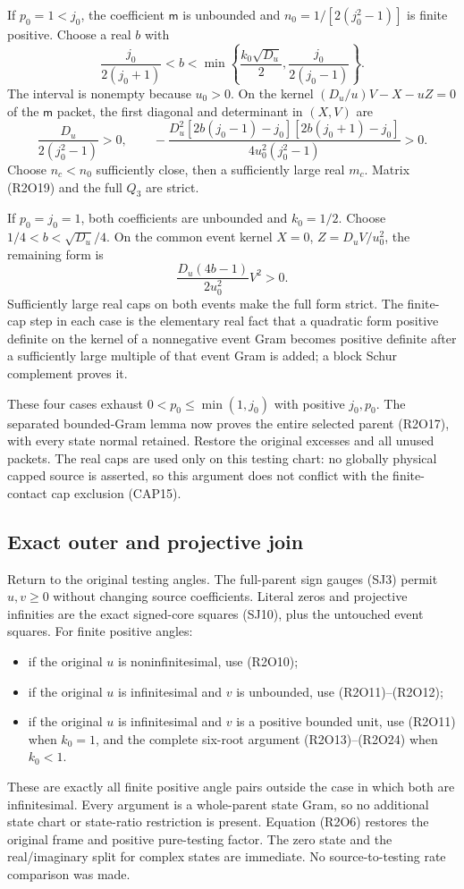 If $p_0=1<j_0$, the coefficient $\mathsf m$ is unbounded and
$n_0=1/[2(j_0^2-1)]$ is finite positive.  Choose a real $b$ with
\[
\frac{j_0}{2(j_0+1)}<b<
\min\left\{\frac{k_0\sqrt{D_u}}2,
                 \frac{j_0}{2(j_0-1)}\right\}.
\]
The interval is nonempty because $u_0>0$.  On the kernel
$(D_u/u)V-X-uZ=0$ of the $\mathsf m$ packet, the first diagonal
and determinant in $(X,V)$ are
\[
\frac{D_u}{2(j_0^2-1)}>0,\qquad
-\frac{D_u^2[2b(j_0-1)-j_0][2b(j_0+1)-j_0]}
       {4u_0^2(j_0^2-1)}>0.
\tag{R2O23}
\]
Choose $n_c<n_0$ sufficiently close, then a sufficiently large real
$m_c$.  Matrix (R2O19) and the full $Q_3$ are strict.

If $p_0=j_0=1$, both coefficients are unbounded and $k_0=1/2$.
Choose $1/4<b<\sqrt{D_u}/4$.  On the common event kernel
$X=0$, $Z=D_uV/u_0^2$, the remaining form is
\[
\frac{D_u(4b-1)}{2u_0^2}V^2>0.
\tag{R2O24}
\]
Sufficiently large real caps on both events make the full form strict.
The finite-cap step in each case is the elementary real fact that a
quadratic form positive definite on the kernel of a nonnegative event
Gram becomes positive definite after a sufficiently large multiple of
that event Gram is added; a block Schur complement proves it.

These four cases exhaust $0<p_0\leq\min(1,j_0)$ with positive $j_0,p_0$.
The separated bounded-Gram lemma now proves the entire selected parent
(R2O17), with every state normal retained.  Restore the original excesses
and all unused packets.  The real caps are used only on this testing
chart: no globally physical capped source is asserted, so this argument
does not conflict with the finite-contact cap exclusion (CAP15).

\subsection{Exact outer and projective join}

Return to the original testing angles.  The full-parent sign gauges
(SJ3) permit $u,v\geq0$ without changing source coefficients.  Literal
zeros and projective infinities are the exact signed-core squares
(SJ10), plus the untouched event squares.  For finite positive angles:
\begin{itemize}
\item if the original $u$ is noninfinitesimal, use (R2O10);
\item if the original $u$ is infinitesimal and $v$ is unbounded,
      use (R2O11)--(R2O12);
\item if the original $u$ is infinitesimal and $v$ is a positive
      bounded unit, use (R2O11) when $k_0=1$, and the complete
      six-root argument (R2O13)--(R2O24) when $k_0<1$.
\end{itemize}
These are exactly all finite positive angle pairs outside the case in
which both are infinitesimal.  Every argument is a whole-parent state
Gram, so no additional state chart or state-ratio restriction is present.
Equation (R2O6) restores the original frame and positive pure-testing
factor.  The zero state and the real/imaginary split for complex states
are immediate.  No source-to-testing rate comparison was made.

